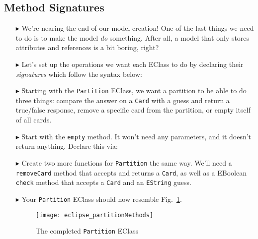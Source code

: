 \newpage
\subsection{Method Signatures}
\texHeader
\hypertarget{static:methods tex}{}

\begin{itemize}

\item[$\blacktriangleright$] We're nearing the end of our model creation! One of the last things we need to do is to make the model \emph{do} something. After
all, a model that only stores attributes and references is a bit boring, right?

\item[$\blacktriangleright$] Let's set up the operations we want each EClass to do by declaring their \emph{signatures} which follow the syntax below:

\item[$\blacktriangleright$] Starting with the \texttt{Partition} EClass, we want a partition to be able to do three things: compare the answer on a
\texttt{Card} with a guess and return a true/false response, remove a specific card from the partition, or empty itself of all cards.

\item[$\blacktriangleright$] Start with the \texttt{empty} method. It won't need any parameters, and it doesn't return anything. Declare this via:

\item[$\blacktriangleright$] Create two more functions for \texttt{Partition} the same way. We'll need a \texttt{removeCard} method that accepts and returns a
\texttt{Card}, as well as a EBoolean \texttt{check} method that accepts a \texttt{Card} and an \texttt{EString} guess. 

\item[$\blacktriangleright$] Your \texttt{Partition} EClass should now resemble Fig.~\ref{fig:partitionMethods}.

\vspace{0.5cm}

\begin{figure}[htbp]
	\centering
  \texttt{[image: eclipse\_partitionMethods]}
	\caption{The completed \texttt{Partition} EClass}
	\label{fig:partitionMethods}
\end{figure}


\end{itemize}
